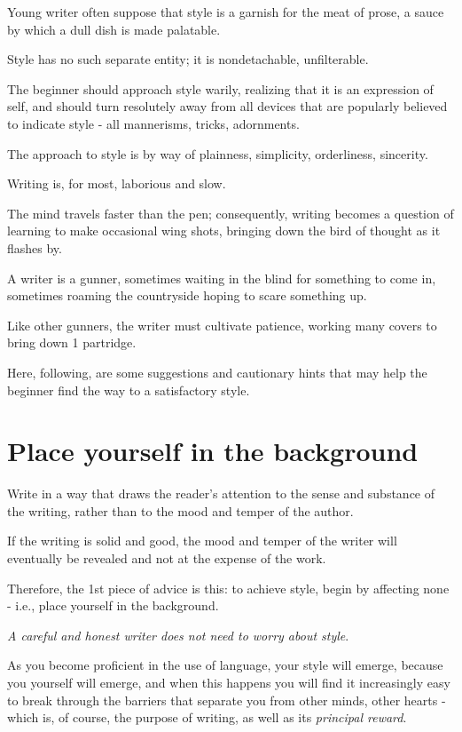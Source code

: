 \documentclass{book}
\numberwithin{equation}{section}
\begin{document}
%
Young writer often suppose that style is a garnish for the meat of prose, a sauce by which a dull dish is made palatable.

Style has no such separate entity; it is nondetachable, unfilterable.

The beginner should approach style warily, realizing that it is an expression of self, and should turn resolutely away from all devices that are popularly believed to indicate style - all mannerisms, tricks, adornments.

The approach to style is by way of plainness, simplicity, orderliness, sincerity.

%
Writing is, for most, laborious and slow.

The mind travels faster than the pen; consequently, writing becomes a question of learning to make occasional wing shots, bringing down the bird of thought as it flashes by.

A writer is a gunner, sometimes waiting in the blind for something to come in, sometimes roaming the countryside hoping to scare something up.

Like other gunners, the writer must cultivate patience, working many covers to bring down 1 partridge.

Here, following, are some suggestions and cautionary hints that may help the beginner find the way to a satisfactory style.

\section{Place yourself in the background}
Write in a way that draws the reader's attention to the sense and substance of the writing, rather than to the mood and temper of the author.

If the writing is solid and good, the mood and temper of the writer will eventually be revealed and not at the expense of the work.

Therefore, the 1st piece of advice is this: to achieve style, begin by affecting none - i.e., place yourself in the background.

\textit{A careful and honest writer does not need to worry about style}.

As you become proficient in the use of language, your style will emerge, because you yourself will emerge, and when this happens you will find it increasingly easy to break through the barriers that separate you from other minds, other hearts - which is, of course, the purpose of writing, as well as its \textit{principal reward}.
\end{document}
